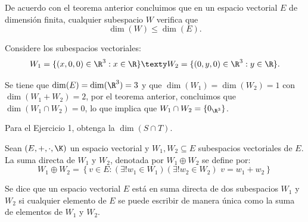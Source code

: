 \documentclass[compacto,10pt]{pubciencias-notas}
\begin{document}
\begin{obs}
De acuerdo con el teorema anterior concluimos que en un espacio vectorial $E$ de dimensión finita, cualquier subespacio $W$ verifica que
\[
\dim(W) \leq \dim(E).
\]
\end{obs}

\begin{ejem}\hspace{0pt} Considere los subespacios vectoriales:
\[
    W_{1} = \{(x,0,0)\in \R^3: x \in \R \} 
    \texty
    W_{2} = \{(0,y,0)\in \R^3: y \in \R\}.
\]

Se tiene que $\dim(E) = \dim(\R^{3}) = 3$ y que $\dim(W_{1}) = \dim(W_{2}) = 1$ con $\dim(W_{1} + W_{2}) = 2$, por el teorema anterior, concluimos que $\dim(W_{1} \cap W_{2}) = 0$, lo que implica que $W_{1} \cap W_{2} = \{0_{\R^{3}}\}$.
\end{ejem}

\begin{ejer}\hspace{0pt} Para el Ejercicio 1, obtenga la $\dim(S\cap T)$.
\end{ejer}

\begin{defi}
    Sean $(E,+,\cdot,\K)$ un espacio vectorial y $W_1, W_2\subseteq E$ subespacios vectoriales de $E$. La suma directa de $W_1$ y $W_2$, denotada por $W_1\oplus W_2$ se define por:
    \[
        W_1 \oplus W_2 =\left\{v\in E : (\exists !w_1\in W_1)(\exists !w_2\in W_2)\, \, v=w_1+w_2 \right\} 
    \]
\end{defi}

\begin{advertencia}
Se dice que un espacio vectorial $E$ está en suma directa de dos subespacios $W_1$ y $W_2$ si cualquier elemento de $E$ se puede escribir de manera única como la suma de elementos de $W_1$ y $W_2$.
\end{advertencia}
\end{document}

